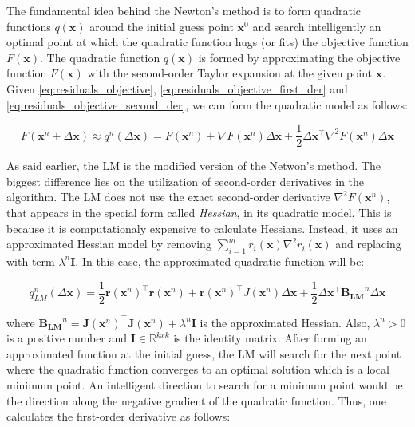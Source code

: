 \documentclass[a4paper]{report}
\numberwithin{figure}{section}
\newcommand{\R}{\mathbb{R}}
\begin{document}
\begin{appendices}
The fundamental idea behind the Newton's method is to form quadratic functions $q(\mathbf{x})$ 
around the initial guess point $\mathbf{x}^0$ and search intelligently an optimal point at which 
the quadratic function hugs (or fits) the objective function $F(\mathbf{x})$. 
The quadratic function $q(\mathbf{x})$ is formed by approximating the objective function $F(\mathbf{x})$ 
with the second-order Taylor expansion at the given point $\mathbf{x}$.
Given 
\eqref{eq:residuals_objective}, 
\eqref{eq:residuals_objective_first_der} and 
\eqref{eq:residuals_objective_second_der}, 
we can form the quadratic model as follows:

\begin{equation}
  F(\mathbf{x}^n + \Delta \mathbf{x}) \approx
  q^n(\Delta \mathbf{x}) = 
  F(\mathbf{x}^n) + 
  \nabla F(\mathbf{x}^n) \Delta \mathbf{x} + 
  \frac{1}{2}\Delta \mathbf{x}^\top \nabla^2 F(\mathbf{x}^n) \Delta 
  \mathbf{x}
\end{equation}


As said earlier, the LM is the modified version of the Netwon's method. 
The biggest difference lies on the utilization of second-order derivatives 
in the algorithm. 
The LM does not use the exact 
second-order derivative $\nabla^2F(\mathbf{x}^n)$, that appears in the special form called \textit{Hessian}, 
in its quadratic model. 
This is because it is computationaly expensive to calculate Hessians. Instead, it uses an approximated 
Hessian model by removing $\sum_{i=1}^mr_i(\mathbf{x})\nabla^2r_i(\mathbf{x})$ 
and replacing with 
term $\lambda^n \mathbf{I}$. In this case, the approximated quadratic function will be:

\begin{equation}
  q_{LM}^n(\Delta \mathbf{x}) = 
  \frac{1}{2}\mathbf{r}(\mathbf{x}^n)^\top\mathbf{r}(\mathbf{x}^n) + 
  \mathbf{r}(\mathbf{x}^n)^\top J(\mathbf{x}^n)\Delta \mathbf{x} + 
  \frac{1}{2}\Delta \mathbf{x}^\top\mathbf{B_{LM}}^n\Delta \mathbf{x}
\end{equation}

where 
$
\mathbf{B_{LM}}^n = \mathbf{J}(\mathbf{x}^n)^\top 
\mathbf{J}(\mathbf{x}^n) + 
\lambda^n \mathbf{I}
$ 
is the approximated Hessian. Also, 
$\lambda^n>0$ is a positive number and $\mathbf{I}\in \R^{kxk}$ is the identity matrix.
After forming an approximated function at the initial guess, the LM 
will search for the next point where the quadratic function converges to an  
optimal solution which is a local minimum point. An intelligent direction  
to search for a minimum point would be the direction along  
the negative gradient of the quadratic function. 
Thus, one calculates the first-order derivative as follows:


\end{appendices}
\end{document}
